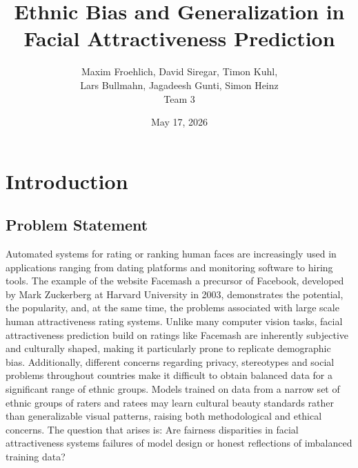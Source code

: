 \documentclass[a4paper,oneside,bibliography=totoc]{scrbook}
\begin{document}
\frontmatter
\subject{Project Report}
\title{Ethnic Bias and Generalization in Facial Attractiveness Prediction}
\author{Maxim Froehlich, David Siregar, Timon Kuhl,\\
  Lars Bullmahn, Jagadeesh Gunti, Simon Heinz\\
  Team 3}
\date{May 17, 2026}
\publishers{{\small Submitted to}\\
  Data and Web Science Group\\
  Prof.\ Dr.\ Christian Bizer\\
  University of Mannheim\\}
\maketitle

\begingroup%
\hypersetup{hidelinks}
\tableofcontents%
\endgroup

\mainmatter

\chapter{Introduction}
\label{ch:intro}

\section{Problem Statement}


Automated systems for rating or ranking human faces are increasingly used in applications ranging from dating platforms and monitoring software to hiring tools. The example of the website Facemash a precursor of Facebook, developed by Mark Zuckerberg at Harvard University in 2003, demonstrates the potential, the popularity, and, at the same time, the problems associated with large scale human attractiveness rating systems. Unlike many computer vision tasks, facial attractiveness prediction build on ratings like Facemash are inherently subjective and culturally shaped, making it particularly prone to replicate demographic bias. Additionally, different concerns regarding privacy, stereotypes and social problems throughout countries make it difficult to obtain balanced data for a significant range of ethnic groups. Models trained on data from a narrow set of ethnic groups of raters and ratees may learn cultural beauty standards rather than generalizable visual patterns, raising both methodological and ethical concerns. The  question that arises is:
Are fairness disparities in facial attractiveness systems failures of model design or honest reflections of imbalanced training data?
\end{document}
